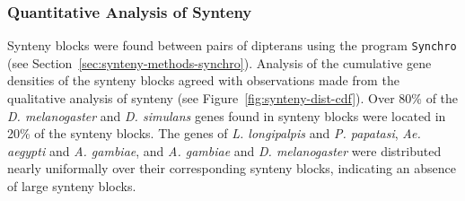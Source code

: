 \subsubsection{Quantitative Analysis of Synteny}
Synteny blocks were found between pairs of dipterans using the program \texttt{Synchro} (see Section~\ref{sec:synteny-methods-synchro}). Analysis of the cumulative gene densities of the synteny blocks agreed with observations made from the qualitative analysis of synteny (see Figure~\ref{fig:synteny-dist-cdf}).  Over 80\% of the \emph{D. melanogaster} and \emph{D. simulans} genes found in synteny blocks were located in 20\% of the synteny blocks.  The genes of \emph{L. longipalpis} and \emph{P. papatasi}, \emph{Ae. aegypti} and \emph{A. gambiae}, and \emph{A. gambiae} and \emph{D. melanogaster} were distributed nearly uniformally over their corresponding synteny blocks, indicating an absence of large synteny blocks.

